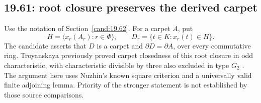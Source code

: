 \subsection{19.61: root closure preserves the derived carpet}
\label{cand:19.61}

Use the notation of Section~\ref{cand:19.62}. For a carpet \(A\), put
\[
 H=\langle x_r(A_r):r\in\Phi\rangle,\qquad
 D_r=\{t\in K:x_r(t)\in H\}.
\]
The candidate asserts that \(D\) is a carpet and
\(\partial D=\partial A\), over every commutative ring.
Troyanskaya previously proved carpet closedness of this root
closure in odd characteristic, with characteristic divisible by
three also excluded in type \(G_2\) \cite{troyanskaya}.
The argument here uses Nuzhin's known square criterion and a
universally valid finite adjoining lemma. Priority of the stronger
statement is not established by those source comparisons.

